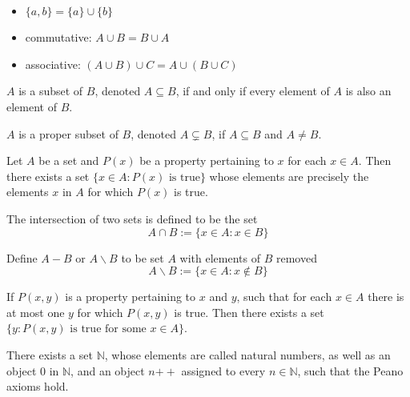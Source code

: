 \documentclass{blog}
\begin{document}
\begin{proposition}~
  \begin{itemize}
  \item $\{a,b\} = \{a\} \cup \{b\}$
  \item commutative: $A \cup B = B \cup A$
  \item associative: $(A \cup B) \cup C = A \cup (B \cup C)$
  \end{itemize}
\end{proposition}

\begin{definition}[subsets]
  $A$ is a subset of $B$, denoted $A \subseteq B$,
  if and only if every element of $A$ is also an element of $B$.

  $A$ is a proper subset of $B$, denoted $A \subsetneq B$,
  if $A \subseteq B$ and $A \neq B$.
\end{definition}

\begin{axiom}
  Let $A$ be a set and $P(x)$ be a property pertaining to $x$ for each $x \in A$.
  Then there exists a set $\{x \in A : P(x) \text{ is true}\}$
  whose elements are precisely the elements $x$ in $A$ for which $P(x)$ is true.
\end{axiom}

\begin{definition}[intersections]
  The intersection of two sets is defined to be the set
  \begin{equation}
    A \cap B := \{x \in A : x \in B\}
  \end{equation}
\end{definition}

\begin{definition}
  Define $A-B$ or $A \backslash B$ to be set $A$ with elements of $B$ removed
  \begin{equation}
    A \backslash B := \{x \in A : x \notin B\}
  \end{equation}
\end{definition}

\begin{axiom}[replacement]
  If $P(x,y)$ is a property pertaining to $x$ and $y$,
  such that for each $x \in A$ there is at most one $y$ for which $P(x,y)$ is true.
  Then there exists a set $\{y : P(x,y) \text{ is true for some } x \in A\}$.
\end{axiom}

\begin{axiom}[infinity]
  There exists a set $\mathbb{N}$, whose elements are called natural numbers,
  as well as an object 0 in $\mathbb{N}$,
  and an object $n{++}$ assigned to every $n \in \mathbb{N}$,
  such that the Peano axioms hold.
\end{axiom}
\end{document}
